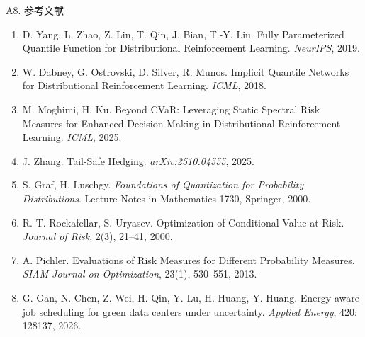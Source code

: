 \documentclass[aspectratio=169, 10pt]{beamer}
\begin{document}
\begin{frame}{A8. 参考文献}
  \scriptsize
  \begin{enumerate}
    \setlength{\itemsep}{1pt}
    \item D. Yang, L. Zhao, Z. Lin, T. Qin, J. Bian, T.-Y. Liu.
          Fully Parameterized Quantile Function for Distributional Reinforcement Learning. \textit{NeurIPS}, 2019.
    \item W. Dabney, G. Ostrovski, D. Silver, R. Munos.
          Implicit Quantile Networks for Distributional Reinforcement Learning. \textit{ICML}, 2018.
    \item M. Moghimi, H. Ku. Beyond CVaR: Leveraging Static Spectral Risk Measures for Enhanced Decision-Making in Distributional Reinforcement Learning. \textit{ICML}, 2025.
    \item J. Zhang. Tail-Safe Hedging. \textit{arXiv:2510.04555}, 2025.
    \item S. Graf, H. Luschgy. \textit{Foundations of Quantization for Probability Distributions}. Lecture Notes in Mathematics 1730, Springer, 2000.
    \item R. T. Rockafellar, S. Uryasev. Optimization of Conditional Value-at-Risk. \textit{Journal of Risk}, 2(3), 21--41, 2000.
    \item A. Pichler. Evaluations of Risk Measures for Different Probability Measures. \textit{SIAM Journal on Optimization}, 23(1), 530--551, 2013.
    \item G. Gan, N. Chen, Z. Wei, H. Qin, Y. Lu, H. Huang, Y. Huang. Energy-aware job scheduling for green data centers under uncertainty. \textit{Applied Energy}, 420: 128137, 2026.
  \end{enumerate}
\end{frame}
\end{document}
